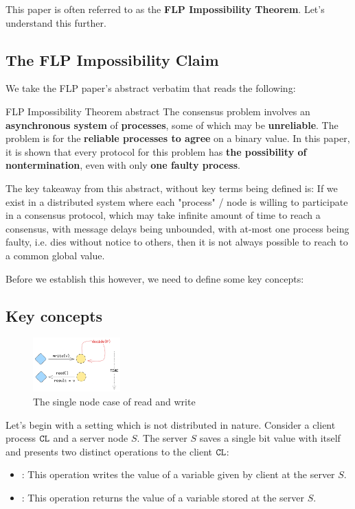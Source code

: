 This paper is often referred to as the \textbf{FLP Impossibility Theorem}. Let's understand this further.

\subsection{The FLP Impossibility Claim}

We take the FLP paper's abstract verbatim that reads the following:

\begin{quotebox}{FLP Impossibility Theorem abstract}
    The consensus problem involves an \textbf{asynchronous system} of \textbf{processes}, some of which may be \textbf{unreliable}. The problem is for the \textbf{reliable processes to agree} on a binary value. In this paper, it is shown that every protocol for this problem has \textbf{the possibility of nontermination}, even with only \textbf{one faulty process}. 
\end{quotebox}

The key takeaway from this abstract, without key terms being defined is: If we exist in a distributed system where each "process" / node is willing to participate in a consensus protocol, which may take infinite amount of time to reach a consensus, with message delays being unbounded, with at-most one process being faulty, i.e. dies without notice to others, then it is not always possible to reach to a common global value.

Before we establish this however, we need to define some key concepts:

\subsection{Key concepts}

\begin{figure}
    \centering
    \includegraphics[width=0.30\textwidth]{general-problems/assets/flp-single-node-read-write.png}
    \caption{The single node case of read and write}
    \label{fig:flp-single-node-read-write}
\end{figure}

Let's begin with a setting which is not distributed in nature. Consider a client process $\verb|CL|$ and a server node $S$. The server $S$ saves a single bit value with itself and presents two distinct operations to the client $\verb|CL|$: 
\begin{itemize}
    \item {}: This operation writes the value of a variable given by client at the server $S$.
    \item {}: This operation returns the value of a variable stored at the server $S$.
\end{itemize}


